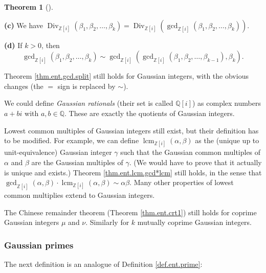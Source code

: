 \documentclass[numbers=enddot,12pt,final,onecolumn,notitlepage]{scrartcl}%
\numberwithin{exer}{subsection}
\theoremstyle{definition}
\newtheorem{theo}{Theorem}[subsection]
\newenvironment{theorem}[1][]
{\begin{theo}[#1]\begin{leftbar}}
{\end{leftbar}\end{theo}}
\newenvironment{noncompile}{}{}
\begin{document}
\begin{noncompile}
\begin{theorem}
\textbf{(c)} We have $\operatorname*{Div}\nolimits_{\mathbb{Z}\left[
i\right]  }\left(  \beta_{1},\beta_{2},\ldots,\beta_{k}\right)
=\operatorname*{Div}\nolimits_{\mathbb{Z}\left[  i\right]  }\left(
\gcd\nolimits_{\mathbb{Z}\left[  i\right]  }\left(  \beta_{1},\beta_{2}%
,\ldots,\beta_{k}\right)  \right)  $.

\textbf{(d)} If $k>0$, then%
\[
\gcd\nolimits_{\mathbb{Z}\left[  i\right]  }\left(  \beta_{1},\beta_{2}%
,\ldots,\beta_{k}\right)  \sim\gcd\nolimits_{\mathbb{Z}\left[  i\right]
}\left(  \gcd\nolimits_{\mathbb{Z}\left[  i\right]  }\left(  \beta_{1}%
,\beta_{2},\ldots,\beta_{k-1}\right)  ,\beta_{k}\right)  .
\]

\end{theorem}

Theorem \ref{thm.ent.gcd.split} still holds for Gaussian integers, with the
obvious changes (the $=$ sign is replaced by $\sim$).
\end{noncompile}

We could define \textit{Gaussian rationals} (their set is called
$\mathbb{Q}\left[  i\right]  $) as complex numbers $a+bi$ with $a,b\in
\mathbb{Q}$. These are exactly the quotients of Gaussian integers.

Lowest common multiples of Gaussian integers still exist, but their definition
has to be modified. For example, we can define $\operatorname{lcm}%
_{\mathbb{Z}\left[  i\right]  }\left(  \alpha,\beta\right)  $ as the (unique
up to unit-equivalence) Gaussian integer $\gamma$ such that the Gaussian
common multiples of $\alpha$ and $\beta$ are the Gaussian multiples of
$\gamma$. (We would have to prove that it actually is unique and exists.)
Theorem \ref{thm.ent.lcm.gcd*lcm} still holds, in the sense that
$\gcd\nolimits_{\mathbb{Z}\left[  i\right]  }\left(  \alpha,\beta\right)
\cdot\operatorname{lcm}_{\mathbb{Z}\left[  i\right]  }\left(  \alpha
,\beta\right)  \sim\alpha\beta$. Many other properties of lowest common
multiplies extend to Gaussian integers.

The Chinese remainder theorem (Theorem \ref{thm.ent.crt1}) still holds for
coprime Gaussian integers $\mu$ and $\nu$. Similarly for $k$ mutually coprime
Gaussian integers.

\subsubsection{Gaussian primes}

The next definition is an analogue of Definition \ref{def.ent.prime}:
\end{document}
